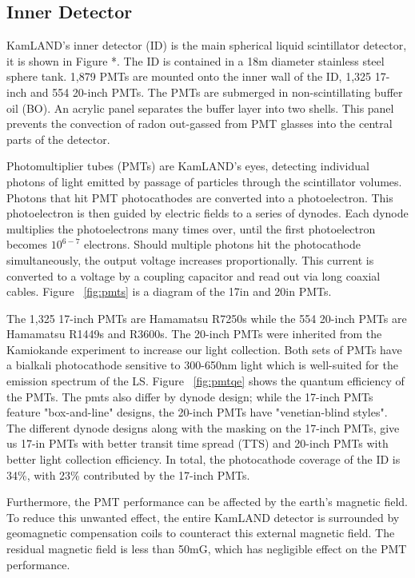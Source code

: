 \subsection{Inner Detector}
KamLAND's inner detector (ID) is the main spherical liquid scintillator detector, it is shown in Figure *. The ID is contained in a 18m diameter stainless steel sphere tank. 1,879 PMTs are mounted onto the inner wall of the ID, 1,325 17-inch and 554 20-inch PMTs. The PMTs are submerged in non-scintillating buffer oil (BO). An acrylic panel separates the buffer layer into two shells. This panel prevents the convection of radon out-gassed from PMT glasses into the central parts of the detector.

Photomultiplier tubes (PMTs) are KamLAND's eyes, detecting individual photons of light emitted by passage of particles through the scintillator volumes. Photons that hit PMT photocathodes are converted into a photoelectron. This photoelectron is then guided by electric fields to a series of dynodes. Each dynode multiplies the photoelectrons many times over, until the first photoelectron becomes $10^{6-7}$ electrons. Should multiple photons hit the photocathode simultaneously, the output voltage increases proportionally. This current is converted to a voltage by a coupling capacitor and read out via long coaxial cables. Figure ~\ref{fig:pmts} is a diagram of the 17in and 20in PMTs.

The 1,325 17-inch PMTs are Hamamatsu R7250s while the 554 20-inch PMTs are Hamamatsu R1449s and R3600s. The 20-inch PMTs were inherited from the Kamiokande experiment to increase our light collection. Both sets of PMTs have a bialkali photocathode sensitive to 300-650nm light which is well-suited for the emission spectrum of the LS. Figure ~\ref{fig:pmtqe} shows the quantum efficiency of the PMTs. The pmts also differ by dynode design; while the 17-inch PMTs feature "box-and-line" designs, the 20-inch PMTs have "venetian-blind styles". The different dynode designs along with the masking on the 17-inch PMTs, give us 17-in PMTs with better transit time spread (TTS) and 20-inch PMTs with better light collection efficiency. In total, the photocathode coverage of the ID is 34\%, with 23\% contributed by the 17-inch PMTs.

Furthermore, the PMT performance can be affected by the earth's magnetic field. To reduce this unwanted effect, the entire KamLAND detector is surrounded by geomagnetic compensation coils to counteract this external magnetic field. The residual magnetic field is less than 50mG, which has negligible effect on the PMT performance.

